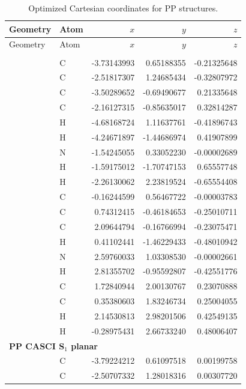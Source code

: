 \begin{longtable}{llrrr}
\caption{Optimized Cartesian coordinates for PP structures.}\label{tab:si_pp_geometries}\\
\hline
Geometry & Atom & $x$ & $y$ & $z$ \\
\hline
\endfirsthead
\hline
Geometry & Atom & $x$ & $y$ & $z$ \\
\hline
\endhead
\hline
\endfoot
\multicolumn{5}{l}{\textbf{PP CASCI S$_0$}}\\
 & C & -3.73143993 &  0.65188355 & -0.21325648 \\
 & C & -2.51817307 &  1.24685434 & -0.32807972 \\
 & C & -3.50289652 & -0.69490677 &  0.21335648 \\
 & C & -2.16127315 & -0.85635017 &  0.32814287 \\
 & H & -4.68168724 &  1.11637761 & -0.41896743 \\
 & H & -4.24671897 & -1.44686974 &  0.41907899 \\
 & N & -1.54245055 &  0.33052230 & -0.00002689 \\
 & H & -1.59175012 & -1.70747153 &  0.65557748 \\
 & H & -2.26130062 &  2.23819524 & -0.65554408 \\
 & C & -0.16244599 &  0.56467722 & -0.00003783 \\
 & C &  0.74312415 & -0.46184653 & -0.25010711 \\
 & C &  2.09644794 & -0.16766994 & -0.23075471 \\
 & H &  0.41102441 & -1.46229433 & -0.48010942 \\
 & N &  2.59760033 &  1.03308530 & -0.00002661 \\
 & H &  2.81355702 & -0.95592807 & -0.42551776 \\
 & C &  1.72840944 &  2.00130767 &  0.23070888 \\
 & C &  0.35380603 &  1.83246734 &  0.25004055 \\
 & H &  2.14530813 &  2.98201506 &  0.42549135 \\
 & H & -0.28975431 &  2.66733240 &  0.48006407 \\
\multicolumn{5}{l}{\textbf{PP CASCI S$_1$ planar}}\\
 & C & -3.79224212 &  0.61097518 &  0.00199758 \\
 & C & -2.50707332 &  1.28018316 &  0.00307720 \\

\end{longtable}
